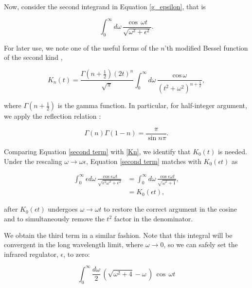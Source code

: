 \documentclass{article}
\numberwithin{equation}{section} %
\begin{document}
Now, consider the second integrand in Equation \ref{g_epsilon}, that is

\begin{equation}
\int^\infty_0 d\omega\, \frac{\cos \, \omega t}{\sqrt{\omega^2+\epsilon^2}}.
\label{second term}
\end{equation}

For later use, we note one of the useful forms of the $n$'th modified Bessel function of the second kind \cite{bessel},

\begin{equation}
K_n(t) = \frac{\Gamma(n+\frac{1}{2})(2t)^n}{\sqrt{\pi}}\int^\infty_0 d\omega \, \frac{\mathrm{cos \,} \omega}{(t^2 + \omega^2)^{n+\frac{1}{2}}},
\label{Kn}
\end{equation}

\noindent where $\Gamma(n+\frac{1}{2})$ is the gamma function. In particular, for half-integer argument, we apply the reflection relation \cite{reflection}:

\begin{equation}
\Gamma(n)\Gamma(1-n) = \frac{\pi}{\sin n\pi}.
\end{equation}

Comparing Equation \ref{second term} with \ref{Kn}, we identify that $K_0(t)$ is needed. Under the rescaling $\omega \rightarrow \omega\epsilon$, Equation \ref{second term} matches with $K_0(\epsilon t)$ as

\begin{equation}
\begin{split}
\int^\infty_0 \epsilon d\omega \, \frac{\cos \epsilon\omega t}{\sqrt{\epsilon^2\omega^2 + \epsilon^2}} & = \int^\infty_0 d\omega \, \frac{\cos \epsilon\omega t}{\sqrt{\omega^2 + 1}},\\
&= K_0(\epsilon t),
\end{split}
\end{equation}

\noindent after $K_0(\epsilon t)$ undergoes $\omega \rightarrow \omega t$ to restore the correct argument in the cosine and to simultaneously remove the $t^2$ factor in the denominator.

We obtain the third term in a similar fashion. Note that this integral will be convergent in the long wavelength limit, where $\omega\rightarrow 0$, so we can safely set the infrared regulator, $\epsilon$, to zero:

\begin{equation}
\int^\infty_0 \frac{d\omega}{2}\, \left(\sqrt{\omega^2 + 4} - \omega\,\right)\, \cos \, \omega t
\label{third term}
\end{equation}
\end{document}
